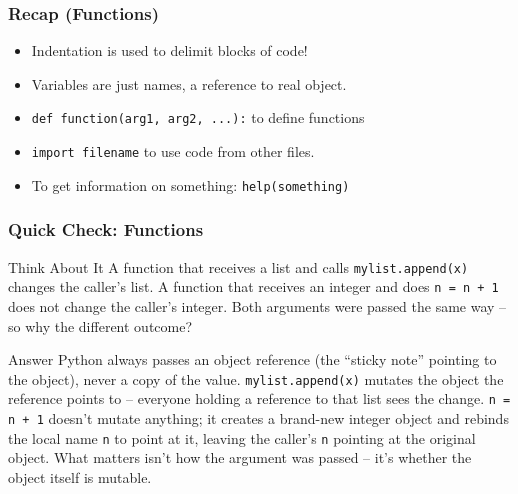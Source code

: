 
\begin{frame}[fragile]\frametitle{Recap (Functions)}
  \begin{itemize}
  \item Indentation is used to delimit blocks of code!
  \item Variables are just names, a reference to real object.
  \item \lstinline|def function(arg1, arg2, ...):| to define functions
  \item \lstinline|import filename| to use code from other files.
  \item To get information on something: \lstinline|help(something)|
  \end{itemize}
\end{frame}

\begin{frame}[fragile]\frametitle{Quick Check: Functions}
\begin{block}{Think About It}
A function that receives a list and calls \texttt{mylist.append(x)} changes the caller's list. A function that receives an integer and does \texttt{n = n + 1} does not change the caller's integer. Both arguments were passed the same way -- so why the different outcome?
\end{block}
\pause
\begin{block}{Answer}
Python always passes an object reference (the ``sticky note'' pointing to the object), never a copy of the value. \texttt{mylist.append(x)} mutates the object the reference points to -- everyone holding a reference to that list sees the change. \texttt{n = n + 1} doesn't mutate anything; it creates a brand-new integer object and rebinds the local name \texttt{n} to point at it, leaving the caller's \texttt{n} pointing at the original object. What matters isn't how the argument was passed -- it's whether the object itself is mutable.
\end{block}
\end{frame}